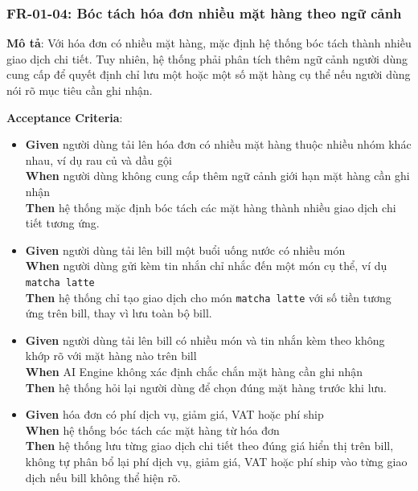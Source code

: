 \subsubsection{FR-01-04: Bóc tách hóa đơn nhiều mặt hàng theo ngữ cảnh}

\textbf{Mô tả}: Với hóa đơn có nhiều mặt hàng, mặc định hệ thống bóc tách thành nhiều giao dịch chi tiết. Tuy nhiên, hệ thống phải phân tích thêm ngữ cảnh người dùng cung cấp để quyết định chỉ lưu một hoặc một số mặt hàng cụ thể nếu người dùng nói rõ mục tiêu cần ghi nhận.



\textbf{Acceptance Criteria}:

\begin{itemize}
\item \textbf{Given} người dùng tải lên hóa đơn có nhiều mặt hàng thuộc nhiều nhóm khác nhau, ví dụ rau củ và dầu gội  \\ \hspace*{1.5em}  \textbf{When} người dùng không cung cấp thêm ngữ cảnh giới hạn mặt hàng cần ghi nhận  \\ \hspace*{1.5em}  \textbf{Then} hệ thống mặc định bóc tách các mặt hàng thành nhiều giao dịch chi tiết tương ứng.
\item \textbf{Given} người dùng tải lên bill một buổi uống nước có nhiều món  \\ \hspace*{1.5em}  \textbf{When} người dùng gửi kèm tin nhắn chỉ nhắc đến một món cụ thể, ví dụ \texttt{matcha latte}  \\ \hspace*{1.5em}  \textbf{Then} hệ thống chỉ tạo giao dịch cho món \texttt{matcha latte} với số tiền tương ứng trên bill, thay vì lưu toàn bộ bill.
\item \textbf{Given} người dùng tải lên bill có nhiều món và tin nhắn kèm theo không khớp rõ với mặt hàng nào trên bill  \\ \hspace*{1.5em}  \textbf{When} AI Engine không xác định chắc chắn mặt hàng cần ghi nhận  \\ \hspace*{1.5em}  \textbf{Then} hệ thống hỏi lại người dùng để chọn đúng mặt hàng trước khi lưu.
\item \textbf{Given} hóa đơn có phí dịch vụ, giảm giá, VAT hoặc phí ship  \\ \hspace*{1.5em}  \textbf{When} hệ thống bóc tách các mặt hàng từ hóa đơn  \\ \hspace*{1.5em}  \textbf{Then} hệ thống lưu từng giao dịch chi tiết theo đúng giá hiển thị trên bill, không tự phân bổ lại phí dịch vụ, giảm giá, VAT hoặc phí ship vào từng giao dịch nếu bill không thể hiện rõ.

\end{itemize}

